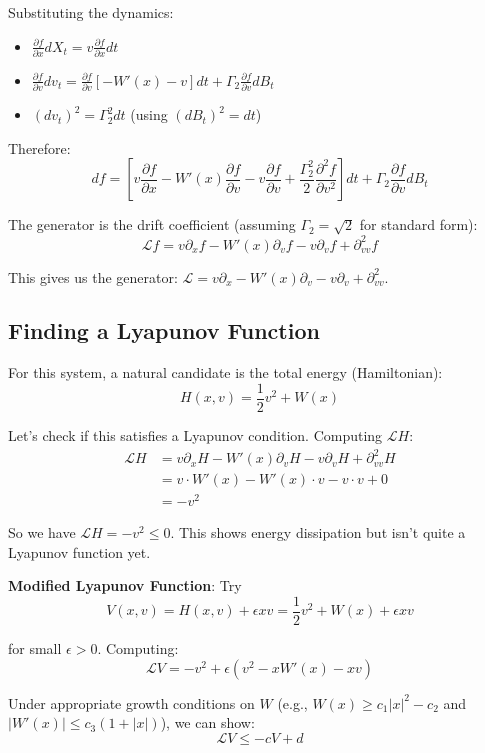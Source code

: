 \documentclass{amsart}
\theoremstyle{plain}
\theoremstyle{definition}
\theoremstyle{remark}
\begin{document}
Substituting the dynamics:

\begin{itemize}
	\item $\frac{\partial f}{\partial x} dX_t = v \frac{\partial f}{\partial x} dt$
	\item $\frac{\partial f}{\partial v} dv_t = \frac{\partial f}{\partial v}[-W'(x) - v]dt + \Gamma_2 \frac{\partial f}{\partial v} dB_t$
	\item $(dv_t)^2 = \Gamma_2^2 dt$ (using $(dB_t)^2 = dt$)
\end{itemize}

Therefore:
\[
df = \left[v \frac{\partial f}{\partial x} - W'(x)\frac{\partial f}{\partial v} - v\frac{\partial f}{\partial v} + \frac{\Gamma_2^2}{2}\frac{\partial^2 f}{\partial v^2}\right]dt + \Gamma_2 \frac{\partial f}{\partial v} dB_t
\]

The generator is the drift coefficient (assuming $\Gamma_2 = \sqrt{2}$ for standard form):
\[
\mathcal{L}f = v\partial_x f - W'(x)\partial_v f - v\partial_v f + \partial_{vv}^2 f
\]

This gives us the generator: $\mathcal{L} = v\partial_x - W'(x)\partial_v - v\partial_v + \partial_{vv}^2$.

\subsection{Finding a Lyapunov Function}

For this system, a natural candidate is the total energy (Hamiltonian):
\[
H(x,v) = \frac{1}{2}v^2 + W(x)
\]

Let's check if this satisfies a Lyapunov condition. Computing $\mathcal{L}H$:
\[
\begin{aligned}
\mathcal{L}H &= v\partial_x H - W'(x)\partial_v H - v\partial_v H + \partial_{vv}^2 H \\
&= v \cdot W'(x) - W'(x) \cdot v - v \cdot v + 0 \\
&= -v^2
\end{aligned}
\]

So we have $\mathcal{L}H = -v^2 \leq 0$. This shows energy dissipation but isn't quite a Lyapunov function yet.

\textbf{Modified Lyapunov Function}: Try
\[
V(x,v) = H(x,v) + \epsilon xv = \frac{1}{2}v^2 + W(x) + \epsilon xv
\]

for small $\epsilon > 0$. Computing:
\[
\mathcal{L}V = -v^2 + \epsilon(v^2 - xW'(x) - xv)
\]

Under appropriate growth conditions on $W$ (e.g., $W(x) \geq c_1|x|^2 - c_2$ and $|W'(x)| \leq c_3(1 + |x|)$), we can show:
\[
\mathcal{L}V \leq -c V + d
\]
\end{document}
